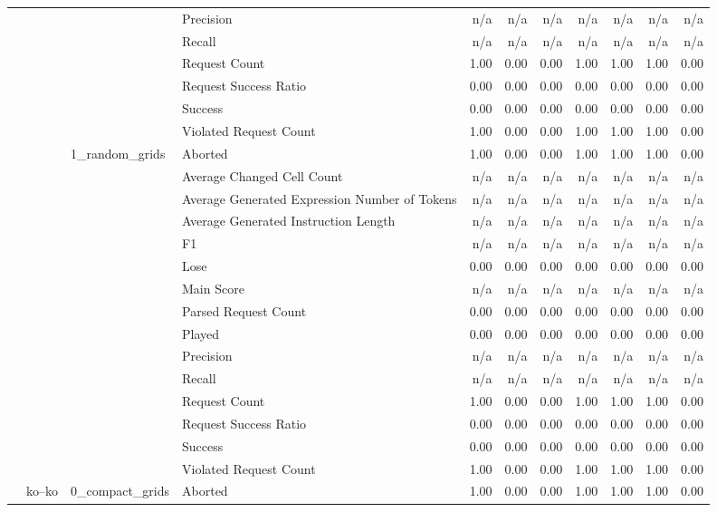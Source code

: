 \begin{tabular}{llllrrrrrrr}
 &  &  & Precision & n/a & n/a & n/a & n/a & n/a & n/a & n/a \\
 &  &  & Recall & n/a & n/a & n/a & n/a & n/a & n/a & n/a \\
 &  &  & Request Count & 1.00 & 0.00 & 0.00 & 1.00 & 1.00 & 1.00 & 0.00 \\
 &  &  & Request Success Ratio & 0.00 & 0.00 & 0.00 & 0.00 & 0.00 & 0.00 & 0.00 \\
 &  &  & Success & 0.00 & 0.00 & 0.00 & 0.00 & 0.00 & 0.00 & 0.00 \\
 &  &  & Violated Request Count & 1.00 & 0.00 & 0.00 & 1.00 & 1.00 & 1.00 & 0.00 \\
\cline{3-11}
 &  & \multirow[t]{15}{*}{1_random_grids} & Aborted & 1.00 & 0.00 & 0.00 & 1.00 & 1.00 & 1.00 & 0.00 \\
 &  &  & Average Changed Cell Count & n/a & n/a & n/a & n/a & n/a & n/a & n/a \\
 &  &  & Average Generated Expression Number of Tokens & n/a & n/a & n/a & n/a & n/a & n/a & n/a \\
 &  &  & Average Generated Instruction Length & n/a & n/a & n/a & n/a & n/a & n/a & n/a \\
 &  &  & F1 & n/a & n/a & n/a & n/a & n/a & n/a & n/a \\
 &  &  & Lose & 0.00 & 0.00 & 0.00 & 0.00 & 0.00 & 0.00 & 0.00 \\
 &  &  & Main Score & n/a & n/a & n/a & n/a & n/a & n/a & n/a \\
 &  &  & Parsed Request Count & 0.00 & 0.00 & 0.00 & 0.00 & 0.00 & 0.00 & 0.00 \\
 &  &  & Played & 0.00 & 0.00 & 0.00 & 0.00 & 0.00 & 0.00 & 0.00 \\
 &  &  & Precision & n/a & n/a & n/a & n/a & n/a & n/a & n/a \\
 &  &  & Recall & n/a & n/a & n/a & n/a & n/a & n/a & n/a \\
 &  &  & Request Count & 1.00 & 0.00 & 0.00 & 1.00 & 1.00 & 1.00 & 0.00 \\
 &  &  & Request Success Ratio & 0.00 & 0.00 & 0.00 & 0.00 & 0.00 & 0.00 & 0.00 \\
 &  &  & Success & 0.00 & 0.00 & 0.00 & 0.00 & 0.00 & 0.00 & 0.00 \\
 &  &  & Violated Request Count & 1.00 & 0.00 & 0.00 & 1.00 & 1.00 & 1.00 & 0.00 \\
\cline{2-11} \cline{3-11}
 & \multirow[t]{30}{*}{ko--ko} & \multirow[t]{15}{*}{0_compact_grids} & Aborted & 1.00 & 0.00 & 0.00 & 1.00 & 1.00 & 1.00 & 0.00 \\

\end{tabular}
